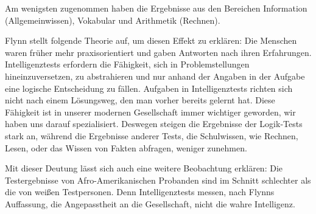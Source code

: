 Am wenigsten zugenommen haben die Ergebnisse aus den Bereichen Information (Allgemeinwissen), Vokabular und Arithmetik (Rechnen).

Flynn stellt folgende Theorie auf, um diesen Effekt zu erklären:
Die Menschen waren früher mehr praxisorientiert und gaben Antworten nach ihren Erfahrungen. Intelligenztests erfordern die Fähigkeit, sich in Problemstellungen hineinzuversetzen, zu abstrahieren und nur anhand der Angaben in der Aufgabe eine logische Entscheidung zu fällen. Aufgaben in Intelligenztests richten sich nicht nach einem Lösungsweg, den man vorher bereits gelernt hat. Diese Fähigkeit ist in unserer modernen Gesellschaft immer wichtiger geworden, wir haben uns darauf spezialisiert. Deswegen steigen die Ergebnisse der Logik-Tests stark an, während die Ergebnisse anderer Tests, die Schulwissen, wie Rechnen, Lesen, oder das Wissen von Fakten abfragen, weniger zunehmen. \cite{flynn}

Mit dieser Deutung lässt sich auch eine weitere Beobachtung erklären: Die Testergebnisse von Afro-Amerikanischen Probanden sind im Schnitt schlechter als die von weißen Testpersonen. Denn Intelligenztests messen, nach Flynns Auffassung, die Angepasstheit an die Gesellschaft, nicht die wahre Intelligenz. \cite{flynn}
